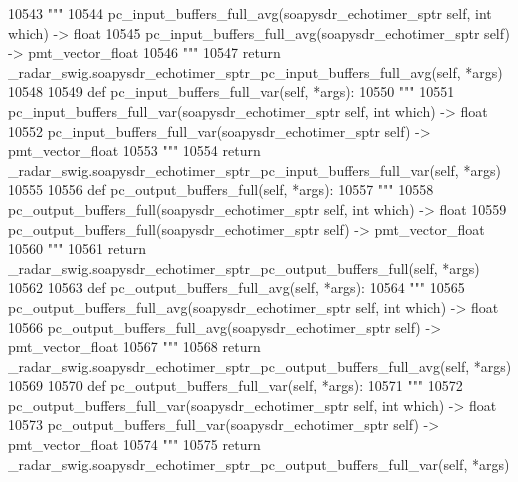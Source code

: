 \begin{DoxyCode}
{{{{{{{{{{{{{{{{{{{{{{{{{{{{{{{{{10543         \textcolor{stringliteral}{"""}
10544 \textcolor{stringliteral}{        pc\_input\_buffers\_full\_avg(soapysdr\_echotimer\_sptr self, int which) -> float}
10545 \textcolor{stringliteral}{        pc\_input\_buffers\_full\_avg(soapysdr\_echotimer\_sptr self) -> pmt\_vector\_float}
10546 \textcolor{stringliteral}{        """}
10547         \textcolor{keywordflow}{return} \_radar\_swig.soapysdr\_echotimer\_sptr\_pc\_input\_buffers\_full\_avg(self, *args)
10548 
10549     \textcolor{keyword}{def }pc_input_buffers_full_var(self, *args):
10550         \textcolor{stringliteral}{"""}
10551 \textcolor{stringliteral}{        pc\_input\_buffers\_full\_var(soapysdr\_echotimer\_sptr self, int which) -> float}
10552 \textcolor{stringliteral}{        pc\_input\_buffers\_full\_var(soapysdr\_echotimer\_sptr self) -> pmt\_vector\_float}
10553 \textcolor{stringliteral}{        """}
10554         \textcolor{keywordflow}{return} \_radar\_swig.soapysdr\_echotimer\_sptr\_pc\_input\_buffers\_full\_var(self, *args)
10555 
10556     \textcolor{keyword}{def }pc_output_buffers_full(self, *args):
10557         \textcolor{stringliteral}{"""}
10558 \textcolor{stringliteral}{        pc\_output\_buffers\_full(soapysdr\_echotimer\_sptr self, int which) -> float}
10559 \textcolor{stringliteral}{        pc\_output\_buffers\_full(soapysdr\_echotimer\_sptr self) -> pmt\_vector\_float}
10560 \textcolor{stringliteral}{        """}
10561         \textcolor{keywordflow}{return} \_radar\_swig.soapysdr\_echotimer\_sptr\_pc\_output\_buffers\_full(self, *args)
10562 
10563     \textcolor{keyword}{def }pc_output_buffers_full_avg(self, *args):
10564         \textcolor{stringliteral}{"""}
10565 \textcolor{stringliteral}{        pc\_output\_buffers\_full\_avg(soapysdr\_echotimer\_sptr self, int which) -> float}
10566 \textcolor{stringliteral}{        pc\_output\_buffers\_full\_avg(soapysdr\_echotimer\_sptr self) -> pmt\_vector\_float}
10567 \textcolor{stringliteral}{        """}
10568         \textcolor{keywordflow}{return} \_radar\_swig.soapysdr\_echotimer\_sptr\_pc\_output\_buffers\_full\_avg(self, *args)
10569 
10570     \textcolor{keyword}{def }pc_output_buffers_full_var(self, *args):
10571         \textcolor{stringliteral}{"""}
10572 \textcolor{stringliteral}{        pc\_output\_buffers\_full\_var(soapysdr\_echotimer\_sptr self, int which) -> float}
10573 \textcolor{stringliteral}{        pc\_output\_buffers\_full\_var(soapysdr\_echotimer\_sptr self) -> pmt\_vector\_float}
10574 \textcolor{stringliteral}{        """}
10575         \textcolor{keywordflow}{return} \_radar\_swig.soapysdr\_echotimer\_sptr\_pc\_output\_buffers\_full\_var(self, *args)
}}}}}}}}}}}}}}}}}}}}}}}}}}}}}}}}}
\end{DoxyCode}
